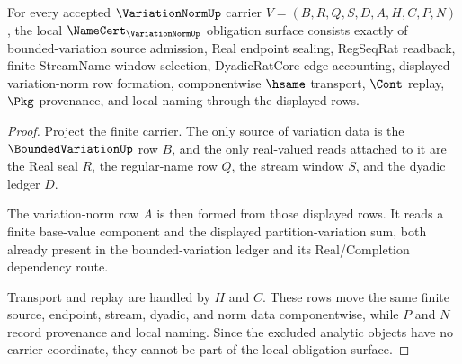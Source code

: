 \begin{theorem}
\label{thm:variation-norm-namecert-obligations}
For every accepted $\VariationNormUp$ carrier $V=(B,R,Q,S,D,A,H,C,P,N)$, the local $\NameCert_{\VariationNormUp}$ obligation surface consists exactly of bounded-variation source admission, Real endpoint sealing, RegSeqRat readback, finite StreamName window selection, DyadicRatCore edge accounting, displayed variation-norm row formation, componentwise $\hsame$ transport, $\Cont$ replay, $\Pkg$ provenance, and local naming through the displayed rows.
\end{theorem}
\begin{proof}
Project the finite carrier. The only source of variation data is the $\BoundedVariationUp$ row $B$, and the only real-valued reads attached to it are the Real seal $R$, the regular-name row $Q$, the stream window $S$, and the dyadic ledger $D$.

The variation-norm row $A$ is then formed from those displayed rows. It reads a finite base-value component and the displayed partition-variation sum, both already present in the bounded-variation ledger and its Real/Completion dependency route.

Transport and replay are handled by $H$ and $C$. These rows move the same finite source, endpoint, stream, dyadic, and norm data componentwise, while $P$ and $N$ record provenance and local naming. Since the excluded analytic objects have no carrier coordinate, they cannot be part of the local obligation surface.
\end{proof}

